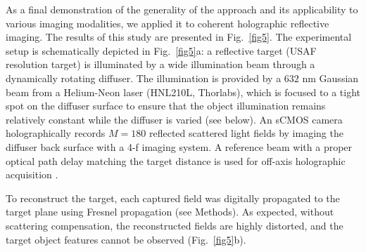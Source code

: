 \documentclass[pdflatex,sn-mathphys-num]{sn-jnl}%
\theoremstyle{thmstyleone}%
\theoremstyle{thmstyletwo}%
\theoremstyle{thmstylethree}%
\begin{document}

As a final demonstration of the generality of the approach and its applicability to various imaging modalities, we applied it to coherent holographic reflective imaging. The results of this study are presented in Fig.~\ref{fig5}. 
The experimental setup is schematically depicted in Fig.~\ref{fig5}a: a reflective target (USAF resolution target) is illuminated by a wide illumination beam through a dynamically rotating diffuser. The illumination is provided by a $632$ nm Gaussian beam from a Helium-Neon laser (HNL210L, Thorlabs), which is focused to a tight spot on the diffuser surface to ensure that the object illumination remains relatively constant while the diffuser is varied (see below). 
An sCMOS camera holographically records $M=180$ reflected scattered light fields by imaging the diffuser back surface with a 4-f imaging system. A reference beam with a proper optical path delay matching the target distance is used for off-axis holographic acquisition \cite{cuche2000spatial}. %

To reconstruct the target, each captured field was digitally propagated to the target plane using Fresnel propagation (see Methods). As expected, without scattering compensation, the reconstructed fields are highly distorted, and the target object features cannot be observed (Fig.~\ref{fig5}b). %

\end{document}
